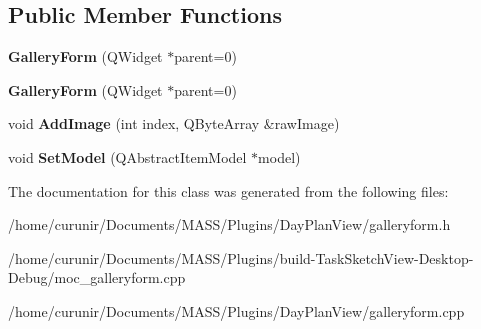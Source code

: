 \subsection*{Public Member Functions}
\begin{DoxyCompactItemize}
\item 
{\bfseries Gallery\+Form} (Q\+Widget $\ast$parent=0)\hypertarget{class_gallery_form_ac733697191bca916d42a2a2cf8370f29}{}\label{class_gallery_form_ac733697191bca916d42a2a2cf8370f29}

\item 
{\bfseries Gallery\+Form} (Q\+Widget $\ast$parent=0)\hypertarget{class_gallery_form_ac733697191bca916d42a2a2cf8370f29}{}\label{class_gallery_form_ac733697191bca916d42a2a2cf8370f29}

\item 
void {\bfseries Add\+Image} (int index, Q\+Byte\+Array \&raw\+Image)\hypertarget{class_gallery_form_adadbe8dca87679d1c3a8e9a85abc8ef7}{}\label{class_gallery_form_adadbe8dca87679d1c3a8e9a85abc8ef7}

\item 
void {\bfseries Set\+Model} (Q\+Abstract\+Item\+Model $\ast$model)\hypertarget{class_gallery_form_a2aa9632ee68fed9318a34cffc6ab3402}{}\label{class_gallery_form_a2aa9632ee68fed9318a34cffc6ab3402}

\end{DoxyCompactItemize}


The documentation for this class was generated from the following files\+:\begin{DoxyCompactItemize}
\item 
/home/curunir/\+Documents/\+M\+A\+S\+S/\+Plugins/\+Day\+Plan\+View/galleryform.\+h\item 
/home/curunir/\+Documents/\+M\+A\+S\+S/\+Plugins/build-\/\+Task\+Sketch\+View-\/\+Desktop-\/\+Debug/moc\+\_\+galleryform.\+cpp\item 
/home/curunir/\+Documents/\+M\+A\+S\+S/\+Plugins/\+Day\+Plan\+View/galleryform.\+cpp\end{DoxyCompactItemize}
